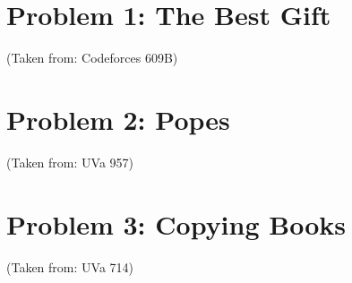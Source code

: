 \normalfont\documentclass[letterpaper,11pt]{article}
\begin{document}
\section*{Problem 1: The Best Gift}
(Taken from: Codeforces 609B)

\section*{Problem 2: Popes}
(Taken from: UVa 957)

\section*{Problem 3: Copying Books}
(Taken from: UVa 714)
\end{document}
